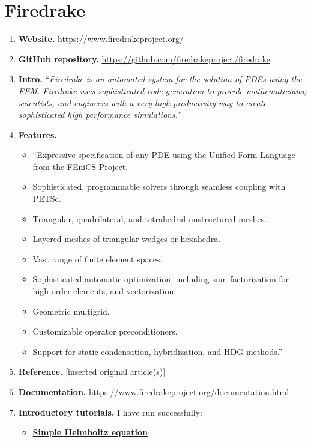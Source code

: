 \documentclass[onsided]{book}
\numberwithin{equation}{section}
\begin{document}
\section{Firedrake}
\begin{enumerate}
    \item \textbf{Website.} \url{https://www.firedrakeproject.org/}
    \item \textbf{GitHub repository.} \url{https://github.com/firedrakeproject/firedrake}
    \item \textbf{Intro.} ``\textit{Firedrake is an automated system for the solution of PDEs using the FEM. Firedrake uses sophisticated code generation to provide mathematicians, scientists, and engineers with a very high productivity way to create sophisticated high performance simulations.}''
    \item \textbf{Features.}
    \begin{itemize}
        \item ``Expressive specification of any PDE using the Unified Form Language from \href{http://fenicsproject.org/}{the FEniCS Project}.
        \item Sophisticated, programmable solvers through seamless coupling with PETSc.
        \item Triangular, quadrilateral, and tetrahedral unstructured meshes.
        \item Layered meshes of triangular wedges or hexahedra.
        \item Vast range of finite element spaces.
        \item Sophisticated automatic optimization, including sum factorization for high order elements, and vectorization.
        \item Geometric multigrid.
        \item Customizable operator preconditioners.
        \item Support for static condensation, hybridization, and HDG methods.''
    \end{itemize}
    \item \textbf{Reference.} [inserted original article(s)]
    \item \textbf{Documentation.} \url{https://www.firedrakeproject.org/documentation.html}
    \item \textbf{Introductory tutorials.} I have run successfully:
    \begin{itemize}
        \item \href{https://www.firedrakeproject.org/demos/helmholtz.py.html}{\textbf{Simple Helmholtz equation}}:

\end{itemize}
\end{enumerate}
\end{document}
